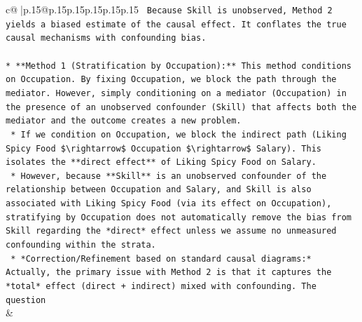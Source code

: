 \documentclass{article}
\begin{document}
{\begin{supertabular}{c@{$\;$}|p{.15\linewidth}@{}p{.15\linewidth}p{.15\linewidth}p{.15\linewidth}p{.15\linewidth}p{.15\linewidth}}
{{{\texttt{    Because Skill is unobserved, Method 2 yields a biased estimate of the causal effect. It conflates the true causal mechanisms with confounding bias.} \\
\\ 
\texttt{*   **Method 1 (Stratification by Occupation):** This method conditions on Occupation. By fixing Occupation, we block the path through the mediator. However, simply conditioning on a mediator (Occupation) in the presence of an unobserved confounder (Skill) that affects both the mediator and the outcome creates a new problem.} \\
\texttt{    *   If we condition on Occupation, we block the indirect path (Liking Spicy Food \$\textbackslash{}rightarrow\$ Occupation \$\textbackslash{}rightarrow\$ Salary). This isolates the **direct effect** of Liking Spicy Food on Salary.} \\
\texttt{    *   However, because **Skill** is an unobserved confounder of the relationship between Occupation and Salary, and Skill is also associated with Liking Spicy Food (via its effect on Occupation), stratifying by Occupation does not automatically remove the bias from Skill regarding the *direct* effect unless we assume no unmeasured confounding within the strata.} \\
\texttt{    *   *Correction/Refinement based on standard causal diagrams:* Actually, the primary issue with Method 2 is that it captures the *total* effect (direct + indirect) mixed with confounding. The question} \\
            }
        }
    }
    & \\ \\


\end{supertabular}}
\end{document}
